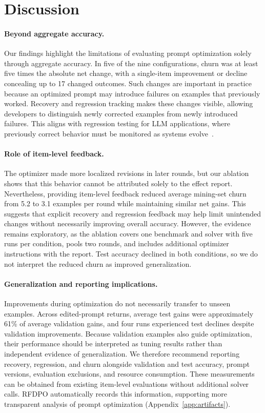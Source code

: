\documentclass[11pt]{article}
\begin{document}
\section{Discussion}
\label{sec:discussion}

\paragraph{Beyond aggregate accuracy.}
Our findings highlight the limitations of evaluating prompt optimization solely through aggregate accuracy. In five of the nine configurations, churn was at least five times the absolute net change, with a single-item improvement or decline concealing up to 17 changed outcomes. Such changes are important in practice because an optimized prompt may introduce failures on examples that previously worked. Recovery and regression tracking makes these changes visible, allowing developers to distinguish newly corrected examples from newly introduced failures. This aligns with regression testing for LLM applications, where previously correct behavior must be monitored as systems evolve~\citep{ma2024regression}.

\paragraph{Role of item-level feedback.}
The optimizer made more localized revisions in later rounds, but our ablation shows that this behavior cannot be attributed solely to the effect report. Nevertheless, providing item-level feedback reduced average mining-set churn from 5.2 to 3.1 examples per round while maintaining similar net gains. This suggests that explicit recovery and regression feedback may help limit unintended changes without necessarily improving overall accuracy. However, the evidence remains exploratory, as the ablation covers one benchmark and solver with five runs per condition, pools two rounds, and includes additional optimizer instructions with the report. Test accuracy declined in both conditions, so we do not interpret the reduced churn as improved generalization.

\paragraph{Generalization and reporting implications.}
Improvements during optimization do not necessarily transfer to unseen examples. Across edited-prompt returns, average test gains were approximately 61\% of average validation gains, and four runs experienced test declines despite validation improvements. Because validation examples also guide optimization, their performance should be interpreted as tuning results rather than independent evidence of generalization. We therefore recommend reporting recovery, regression, and churn alongside validation and test accuracy, prompt versions, evaluation exclusions, and resource consumption. These measurements can be obtained from existing item-level evaluations without additional solver calls. RFDPO automatically records this information, supporting more transparent analysis of prompt optimization (Appendix~\ref{app:artifacts}).
\end{document}

